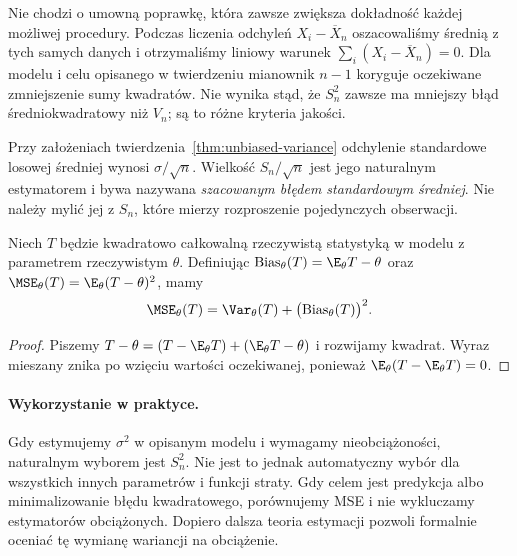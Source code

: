 \begin{uwaga}[Dlaczego $n-1$?]
Nie chodzi o umowną poprawkę, która zawsze zwiększa dokładność każdej możliwej procedury. Podczas liczenia odchyleń $X_i-\overline X_n$ oszacowaliśmy średnią z tych samych danych i otrzymaliśmy liniowy warunek $\sum_i(X_i-\overline X_n)=0$. Dla modelu i celu opisanego w twierdzeniu mianownik $n-1$ koryguje oczekiwane zmniejszenie sumy kwadratów. Nie wynika stąd, że $S_n^2$ zawsze ma mniejszy błąd średniokwadratowy niż $V_n$; są to różne kryteria jakości.
\end{uwaga}

\begin{wniosek}\label{cor:se}
Przy założeniach twierdzenia~\ref{thm:unbiased-variance} odchylenie standardowe losowej średniej wynosi $\sigma/\sqrt n$. Wielkość $S_n/\sqrt n$ jest jego naturalnym estymatorem i bywa nazywana \emph{szacowanym błędem standardowym średniej}. Nie należy mylić jej z $S_n$, które mierzy rozproszenie pojedynczych obserwacji.
\end{wniosek}

\begin{stwierdzenie}\label{prop:biasvar}
Niech $T$ będzie kwadratowo całkowalną rzeczywistą statystyką w modelu z parametrem rzeczywistym $\theta$. Definiując $\operatorname{Bias}_\theta(T)=\E_\theta T-\theta$ oraz $\MSE_\theta(T)=\E_\theta(T-\theta)^2$, mamy
\[
\MSE_\theta(T)=\Var_\theta(T)+\bigl(\operatorname{Bias}_\theta(T)\bigr)^2.
\]
\end{stwierdzenie}
\begin{proof}
Piszemy $T-\theta=(T-\E_\theta T)+(\E_\theta T-\theta)$ i rozwijamy kwadrat. Wyraz mieszany znika po wzięciu wartości oczekiwanej, ponieważ $\E_\theta(T-\E_\theta T)=0$.
\end{proof}

\paragraph{Wykorzystanie w praktyce.}
Gdy estymujemy $\sigma^2$ w opisanym modelu i wymagamy nieobciążoności, naturalnym wyborem jest $S_n^2$. Nie jest to jednak automatyczny wybór dla wszystkich innych parametrów i funkcji straty. Gdy celem jest predykcja albo minimalizowanie błędu kwadratowego, porównujemy MSE i nie wykluczamy estymatorów obciążonych. Dopiero dalsza teoria estymacji pozwoli formalnie oceniać tę wymianę wariancji na obciążenie.

